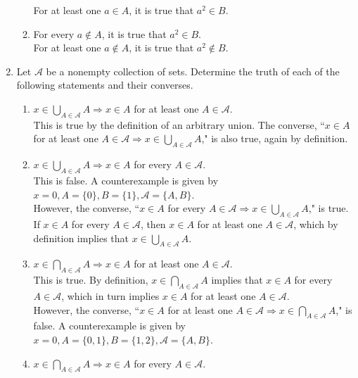 \documentclass{article}
\begin{document}
\begin{enumerate}
\begin{enumerate}
                        For at least one $a \in A$, it is true that $a^{2} \in B$.
                  \item For every $a \notin A$, it is true that $a^{2} \in B$.\\
                        For at least one $a \notin A$, it is true that $a^{2} \notin B$.
            \end{enumerate}
      \item Let $\mathcal{A}$ be a nonempty collection of sets. Determine the truth of each of the following statements and their converses.
            \begin{enumerate}
                  \item $x \in \bigcup_{A \in \mathcal{A}} A \Rightarrow x \in A$ for at least one $A \in \mathcal{A}$.\\
                        This is true by the definition of an arbitrary union. The converse, “$x \in A$ for at least one $A \in \mathcal{A} \Rightarrow x \in \bigcup_{A \in \mathcal{A}} A$," is also true, again by definition.
                  \item $x \in \bigcup_{A \in \mathcal{A}} A \Rightarrow x \in A$ for every $A \in \mathcal{A}$.\\
                        This is false. A counterexample is given by $x = 0, A = \{0\}, B = \{1\}, \mathcal{A} = \{A, B\}$.\\ 
                        However, the converse, “$x \in A$ for every $A \in \mathcal{A} \Rightarrow x \in \bigcup_{A \in \mathcal{A}} A$," is true. If $x \in A$ for every $A \in \mathcal{A}$, then $x \in A$ for at least one $A \in \mathcal{A}$, which by definition implies that $x \in \bigcup_{A \in \mathcal{A}} A$.
                  \item $x \in \bigcap_{A \in \mathcal{A}} A \Rightarrow x \in A$ for at least one $A \in \mathcal{A}$.\\
                        This is true. By definition, $x \in \bigcap_{A \in \mathcal{A}} A$ implies that $x \in A$ for every $A \in \mathcal{A}$, which in turn implies $x \in A$ for at least one $A \in \mathcal{A}$.\\
                        However, the converse, “$x \in A$ for at least one $A \in \mathcal{A} \Rightarrow x \in \bigcap_{A \in \mathcal{A}} A$," is false. A counterexample is given by $x = 0, A = \{0, 1\}, B = \{1, 2\}, \mathcal{A} = \{A, B\}$. 
                  \item $x \in \bigcap_{A \in \mathcal{A}} A \Rightarrow x \in A$ for every $A \in \mathcal{A}$.\\

\end{enumerate}
\end{enumerate}
\end{document}
